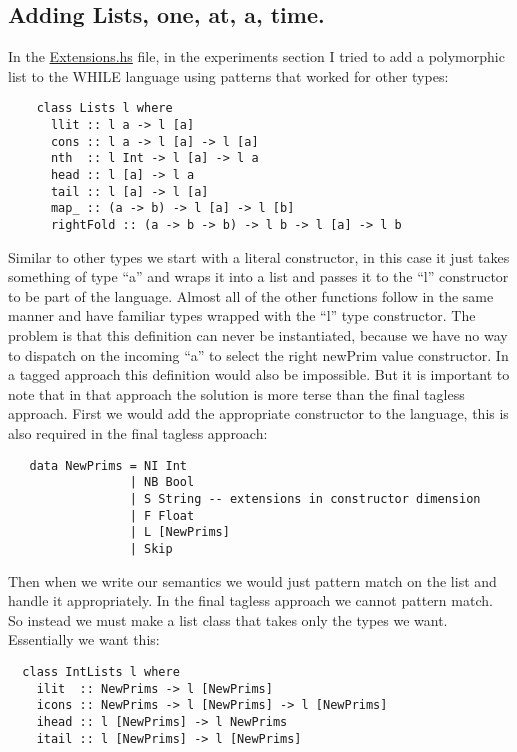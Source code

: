 \documentclass[9pt,letterpaper]{extarticle}
\begin{document}
  \subsection{Adding Lists, one, at, a, time.}
  In the \underline{Extensions.hs} file, in the experiments section I tried to add a
  polymorphic list to the WHILE language using patterns that worked for other
  types:
  
  \begin{verbatim}
    class Lists l where
      llit :: l a -> l [a]
      cons :: l a -> l [a] -> l [a]
      nth  :: l Int -> l [a] -> l a
      head :: l [a] -> l a
      tail :: l [a] -> l [a]
      map_ :: (a -> b) -> l [a] -> l [b]
      rightFold :: (a -> b -> b) -> l b -> l [a] -> l b
  \end{verbatim}

  Similar to other types we start with a literal constructor, in this case it
  just takes something of type ``a'' and wraps it into a list and passes it to
  the ``l'' constructor to be part of the language. Almost all of the other
  functions follow in the same manner and have familiar types wrapped with the
  ``l'' type constructor. The problem is that this definition can never be
  instantiated, because we have no way to dispatch on the incoming ``a'' to
  select the right newPrim value constructor. In a tagged approach this definition
  would also be impossible. But it is important to note that in that approach
  the solution is more terse than the final tagless approach. First we would add
  the appropriate constructor to the language, this is also required in the
  final tagless approach:
  
  \begin{verbatim}
   data NewPrims = NI Int
                 | NB Bool
                 | S String -- extensions in constructor dimension
                 | F Float
                 | L [NewPrims]
                 | Skip
  \end{verbatim}

  Then when we write our semantics we would just pattern match on the list and
  handle it appropriately. In the final tagless approach we cannot pattern
  match. So instead we must make a list class that takes only the types we want.
  Essentially we want this:

  \begin{verbatim}
  class IntLists l where
    ilit  :: NewPrims -> l [NewPrims]
    icons :: NewPrims -> l [NewPrims] -> l [NewPrims]
    ihead :: l [NewPrims] -> l NewPrims
    itail :: l [NewPrims] -> l [NewPrims]
  \end{verbatim}
\end{document}
